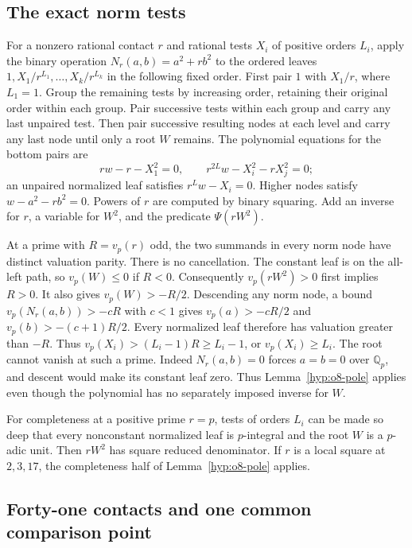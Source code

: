 \documentclass[11pt]{article}
\theoremstyle{definition}
\theoremstyle{remark}
\newcommand{\Q}{\mathbb Q}
\begin{document}
\subsection{The exact norm tests}

For a nonzero rational contact $r$ and rational tests $X_i$ of positive
orders $L_i$, apply the binary operation
$N_r(a,b)=a^2+rb^2$ to the ordered leaves
$1,X_1/r^{L_1},\ldots,X_k/r^{L_k}$ in the following fixed order.
First pair $1$ with $X_1/r$, where $L_1=1$. Group the remaining
tests by increasing order, retaining their original order within each
group. Pair successive tests within each group and carry any last
unpaired test. Then pair successive resulting nodes at each level and
carry any last node until only a root $W$ remains. The polynomial
equations for the bottom pairs are
\[
 rw-r-X_1^2=0,\qquad
 r^{2L}w-X_i^2-rX_j^2=0;
\]
an unpaired normalized leaf satisfies $r^Lw-X_i=0$.
Higher nodes satisfy $w-a^2-rb^2=0$. Powers of $r$ are computed
by binary squaring. Add an inverse for $r$, a variable for $W^2$,
and the predicate $\Psi(rW^2)$.

At a prime with $R=v_p(r)$ odd, the two summands in every norm node
have distinct valuation parity. There is no cancellation. The constant
leaf is on the all-left path, so $v_p(W)\le0$ if $R<0$.
Consequently $v_p(rW^2)>0$ first implies $R>0$.
It also gives $v_p(W)>-R/2$. Descending any norm node, a bound
$v_p(N_r(a,b))>-cR$ with $c<1$ gives
$v_p(a)>-cR/2$ and $v_p(b)>-(c+1)R/2$.
Every normalized leaf therefore has valuation greater than $-R$.
Thus $v_p(X_i)>(L_i-1)R\ge L_i-1$, or $v_p(X_i)\ge L_i$.
The root cannot vanish at such a prime. Indeed $N_r(a,b)=0$ forces
$a=b=0$ over $\Q_p$, and descent would make its constant leaf zero.
Thus Lemma~\ref{hyp:o8-pole} applies even though the polynomial
has no separately imposed inverse for $W$.

For completeness at a positive prime $r=p$, tests of orders $L_i$
can be made so deep that every nonconstant normalized leaf is
$p$-integral and the root $W$ is a $p$-adic unit. Then $rW^2$ has
square reduced denominator. If $r$ is a local square at $2,3,17$,
the completeness half of Lemma~\ref{hyp:o8-pole} applies.

\subsection{Forty-one contacts and one common comparison point}
\end{document}
